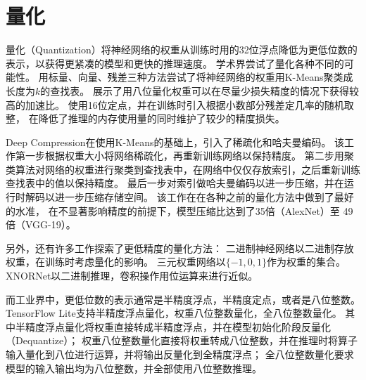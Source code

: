 \section{量化}
量化（Quantization）将神经网络的权重从训练时用的32位浮点降低为更低位数的表示，以获得更紧凑的模型和更快的推理速度。
学术界尝试了量化各种不同的可能性。
\cite{gong2014compressing}用标量、向量、残差三种方法尝试了将神经网络的权重用K-Means聚类成长度为$k$的查找表。
\cite{vanhoucke2011improving}展示了用八位量化权重可以在尽量少损失精度的情况下获得较高的加速比。
\cite{gupta2015deep}使用16位定点，并在训练时引入根据小数部分残差定几率的随机取整，
在降低了推理的内存使用量的同时维护了较少的精度损失。

Deep Compression\cite{han2015deep}在\cite{gong2014compressing}使用K-Means的基础上，引入了稀疏化和哈夫曼编码。
该工作第一步根据权重大小将网络稀疏化，再重新训练网络以保持精度。
第二步用聚类算法对网络的权重进行聚类到查找表中，在网络中仅仅存放索引，之后重新训练查找表中的值以保持精度。
最后一步对索引做哈夫曼编码以进一步压缩，并在运行时解码以进一步压缩存储空间。
该工作在在各种之前的量化方法中做到了最好的水准，
在不显著影响精度的前提下，模型压缩比达到了35倍（AlexNet）至 49倍（VGG-19）。

另外，还有许多工作探索了更低精度的量化方法：
二进制神经网络\cite{courbariaux2016binarized}以二进制存放权重，在训练时考虑量化的影响。
三元权重网络\cite{li2016ternary}以$\{-1,0,1\}$作为权重的集合。
XNORNet\cite{rastegari2016xnor}以二进制推理，卷积操作用位运算来进行近似。

而工业界中，更低位数的表示通常是半精度浮点，半精度定点，或者是八位整数。
TensorFlow Lite支持半精度浮点量化，权重八位整数量化，全八位整数量化。
其中半精度浮点量化将权重直接转成半精度浮点，并在模型初始化阶段反量化（Dequantize）；
权重八位整数量化直接将权重转成八位整数，并在推理时将算子输入量化到八位进行运算，并将输出反量化到全精度浮点；
全八位整数量化要求模型的输入输出均为八位整数，并全部使用八位整数推理。
